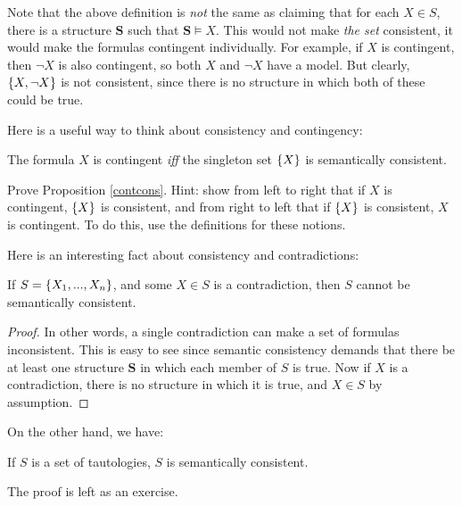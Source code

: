 \begin{remark}
Note that the above definition is \textit{not} the same as claiming that for each $X \in S$, there is a structure $\mathbf{S}$ such that $\mathbf{S} \models X$. This would not make \textit{the set} consistent, it would make the formulas contingent individually. For example, if $X$ is contingent, then $\neg X$ is also contingent, so both $X$ and $\neg X$ have a model. But clearly, $\{X, \neg X\}$ is not consistent, since there is no structure in which both of these could be true.  
\end{remark}

Here is a useful way to think about consistency and contingency:

\begin{prop}
The formula $X$ is contingent \textit{iff} the singleton set $\{X\}$ is semantically consistent. \label{contcons}
\end{prop}

\begin{exc}
Prove Proposition \ref{contcons}. Hint: show from left to right that if $X$ is contingent, $\{X\}$ is consistent, and from right to left that if $\{X\}$ is consistent, $X$ is contingent. To do this, use the definitions for these notions. 
\end{exc}

Here is an interesting fact about consistency and contradictions:

\begin{prop}
If $S=\{X_1, ..., X_n\}$, and some $X \in S$ is a contradiction, then $S$ cannot be semantically consistent. 
\end{prop}

\begin{proof}
In other words, a single contradiction can make a set of formulas inconsistent. This is easy to see since semantic consistency demands that there be at least one structure $\mathbf{S}$ in which each member of $S$ is true. Now if $X$ is a contradiction, there is no structure in which it is true, and $X \in S$ by assumption. 
\end{proof}

On the other hand, we have:

\begin{prop}
If $S$ is a set of tautologies, $S$ is semantically consistent. 
\end{prop}

\begin{exc}
The proof is left as an exercise. 
\end{exc}
 
